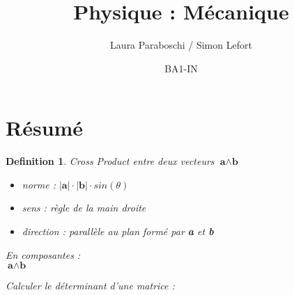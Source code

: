 \documentclass{article}
\title{Physique : Mécanique}
\author{Laura Paraboschi / Simon Lefort}
\date{BA1-IN}
\newtheorem{definition}{Definition}[section]
\begin{document}
\maketitle

\section{Résumé}

\begin{definition} Cross Product entre deux vecteurs $ \textbf{a} \wedge \textbf{b} $

\begin{itemize}
    \item norme : $ |\textbf{a}| \cdot |\textbf{b}| \cdot sin(\theta) $
    \item sens : règle de la main droite
    \item direction : parallèle au plan formé par \textbf{a} et \textbf{b}
\end{itemize}

En composantes :\\

 $ \textbf{a} \wedge \textbf{b} $

Calculer le déterminant d'une matrice :
 

\end{definition}
\end{document}
